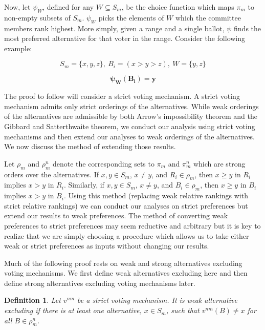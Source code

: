 \documentclass{amsart}
\newtheorem{definition}{Definition}
\theoremstyle{plain}
\begin{document}
Now, let $\psi_W$, defined for any $W \subseteq S_m$, be the choice function which maps $\pi_m$ to non-empty subsets of $S_m$. $\psi_W$ picks the elements of $W$ which the committee members rank highest. More simply, given a range and a single ballot, $\psi$ finds the most preferred alternative for that voter in the range. Consider the following example: 

\begin{equation*}
    S_m = \{x, y, z\}, \: B_i = (x > y > z),\: W = \{y , z\}
\end{equation*}

\begin{equation*}
    \mathbf{\psi_W(B_i) = y}
\end{equation*}

\vskip 0.25cm

The proof to follow will consider a strict voting mechanism. A strict voting mechanism admits only strict orderings of the alternatives. While weak orderings of the alternatives are admissible by both Arrow's impossibility theorem and the Gibbard and Satterthwaite theorem, we conduct our analysis using strict voting mechanisms and then extend our analyses to weak orderings of the alternatives. We now discuss the method of extending those results.

Let $\rho_m$ and $\rho_m^n$ denote the corresponding sets to $\pi_m$ and $\pi_m^n$ which are strong orders over the alternatives. If $x,y \in S_m$, $x \ne y$, and $R_i \in \rho_m$, then $x \ge y$ in $R_i$ implies $x > y$ in $R_i$. Similarly, if $x,y \in S_m$, $x \ne y$, and $B_i \in \rho_m$, then $x \ge y$ in $B_i$ implies $x > y$ in $B_i$. Using this method (replacing weak relative rankings with strict relative rankings) we can conduct our analyses on strict preferences but extend our results to weak preferences. The method of converting weak preferences to strict preferences may seem reductive and arbitrary but it is key to realize that we are simply choosing a procedure which allows us to take either weak or strict preferences as inputs without changing our results.


Much of the following proof rests on weak and strong alternatives excluding voting mechanisms. We first define weak alternatives excluding here and then define strong alternatives excluding voting mechanisms later. 

\begin{definition}
    Let $v^{nm}$ be a strict voting mechanism. It is weak alternative excluding if there is at least one alternative, $x \in S_m$, such that $v^{nm}(B) \ne x$ for all $B \in \rho_m^n$.  
\end{definition}
\end{document}
